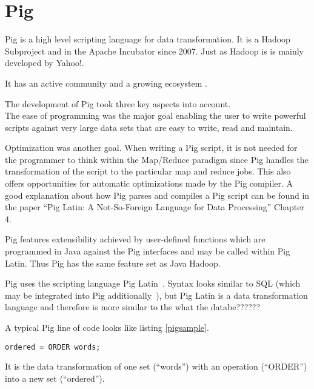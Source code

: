 \section{Pig}

Pig is a high level scripting language for data transformation. It is a Hadoop Subproject and in the Apache Incubator since 2007. Just as Hadoop is is mainly developed by Yahoo!. 

It has an active community and a growing ecosystem .

The development of Pig took three key aspects into account. \\
The ease of programming was the major goal enabling the user to write powerful scripts against very large data sets that are easy to write, read and maintain.~\cite{pigWebsite}

Optimization was another goal. When writing a Pig script, it is not needed for the programmer to think within the Map/Reduce paradigm since Pig handles the transformation of the script to the particular map and reduce jobs. This also offers opportunities for automatic optimizations made by the Pig compiler. A good explanation about how Pig parses and compiles a Pig script can be found in the paper ``Pig Latin: A Not-So-Foreign Language for Data Processing'' Chapter 4.~\cite{pigNotForeign}

Pig features extensibility achieved by user-defined functions which are programmed in Java against the Pig interfaces and may be called within Pig Latin. Thus Pig has the same feature set as Java Hadoop.

Pig uses the scripting language Pig Latin~\cite{pigManual}. Syntax looks similar to SQL (which may be integrated into Pig additionally~\cite{pigSql}), but Pig Latin is a data transformation language and therefore is more similar to the what the databe??????  

A typical Pig line of code looks like listing \ref{pigsample}.

\begin{lstlisting}[language=pig,caption=A typical Pig line of code,label=pigsample]
ordered = ORDER words;
\end{lstlisting}

It is the data transformation of one set (``words'') with an operation (``ORDER'') into a new set (``ordered'').
                                                                                                               